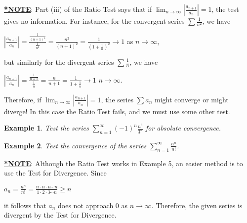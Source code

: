 \documentclass[paper=a4, fontsize=11pt]{scrartcl} %
\numberwithin{equation}{section} %
\numberwithin{figure}{section} %
\numberwithin{table}{section} %
\newtheorem{example}{Example}
\newcommand{\ds}{\displaystyle}
\newcommand{\enter}{\vspace{5mm}}
\newcommand{\senter}{\vspace{3mm}}
\begin{document}
\noindent\underline{\textbf{*NOTE}}: Part (iii) of the Ratio Test says that if $\ds\lim_{n\to\infty}\left|\frac{a_{n+1}}{a_n}\right|=1$, the test gives no information. For instance, for the convergent series $\ds\sum\frac{1}{n^2}$, we have

\senter

\begin{center}
$\ds\left|\frac{a_{n+1}}{a_n}\right|=\frac{\ds\frac{1}{(n+1)^2}}{\ds\frac{1}{n^2}}=\frac{n^2}{(n+1)^2}=\frac{1}{\ds\left(1+\frac{1}{n}\right)^2}\to1$ \quad as $n\to\infty$,
\end{center}

\senter

\noindent but similarly for the divergent series $\ds\sum\frac{1}{n}$, we have

\senter

\begin{center}
$\ds\left|\frac{a_{n+1}}{a_n}\right|=\frac{\ds\frac{1}{n+1}}{\ds\frac{1}{n}}=\frac{n}{n+1}=\frac{1}{1+\ds\frac{1}{n}}\to1$ \quad $n\to\infty$.
\end{center}

\senter

\noindent Therefore, if $\ds\lim_{n\to\infty}\left|\frac{a_{n+1}}{a_n}\right|=1$, the series $\ds\sum a_n$ might converge or might diverge! In this case the Ratio Test fails, and we must use some other test.

\newpage

\begin{example}
Test the series $\ds\sum_{n=1}^{\infty}(-1)^n\frac{n^3}{3^n}$ for absolute convergence.
\end{example}

\vfill

\begin{example}
Test the convergence of the series $\ds\sum_{n=1}^{\infty}\frac{n^n}{n!}$.
\end{example}

\vfill

\noindent\underline{\textbf{*NOTE}}: Although the Ratio Test works in Example 5, an easier method is to use the Test for Divergence. Since

\begin{center}
$a_n=\ds\frac{n^n}{n!}=\frac{n\cdot n\cdot n\cdots n}{1\cdot2\cdot3\cdots n}\geq n$
\end{center}

\enter

\noindent it follows that $a_n$ does not approach 0 as $n\to\infty$. Therefore, the given series is divergent by the Test for Divergence.
\end{document}
